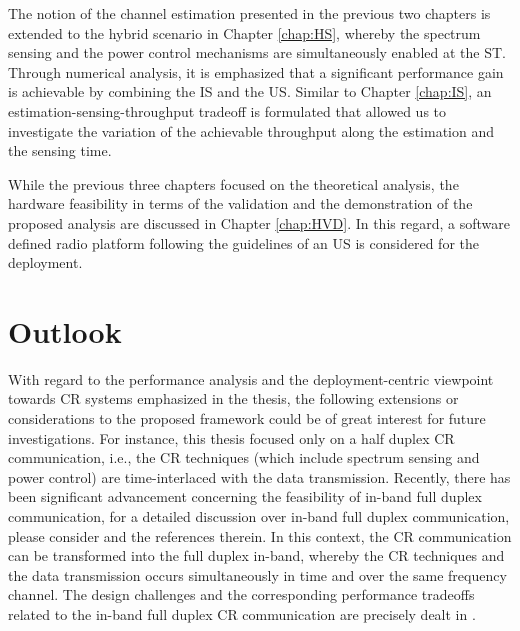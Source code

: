 The notion of the channel estimation presented in the previous two chapters is extended to the hybrid scenario in Chapter \ref{chap:HS}, whereby the spectrum sensing and the power control mechanisms are simultaneously enabled at the ST. Through numerical analysis, it is emphasized that a significant performance gain is achievable by combining the IS and the US. Similar to Chapter \ref{chap:IS}, an estimation-sensing-throughput tradeoff is formulated that allowed us to investigate the variation of the achievable throughput along the estimation and the sensing time. 

While the previous three chapters focused on the theoretical analysis, the hardware feasibility in terms of the validation and the demonstration of the proposed analysis are discussed in Chapter \ref{chap:HVD}. In this regard, a software defined radio platform following the guidelines of an US is considered for the deployment. 


\section{Outlook}
With regard to the performance analysis and the deployment-centric viewpoint towards CR systems emphasized in the thesis, the following extensions or considerations to the proposed framework could be of great interest for future investigations. For instance, this thesis focused only on a half duplex CR communication, i.e., the CR techniques (which include spectrum sensing and power control) are time-interlaced with the data transmission. Recently, there has been significant advancement concerning the feasibility of in-band full duplex communication, for a detailed discussion over in-band full duplex communication, please consider \cite{Bhar13, Sab14, Liu15} and the references therein. In this context, the CR communication can be transformed into the full duplex in-band, whereby the CR techniques and the data transmission occurs simultaneously in time and over the same frequency channel. The design challenges and the corresponding performance tradeoffs related to the in-band full duplex CR communication are precisely dealt in \cite{Liao15, Kim15}. 

